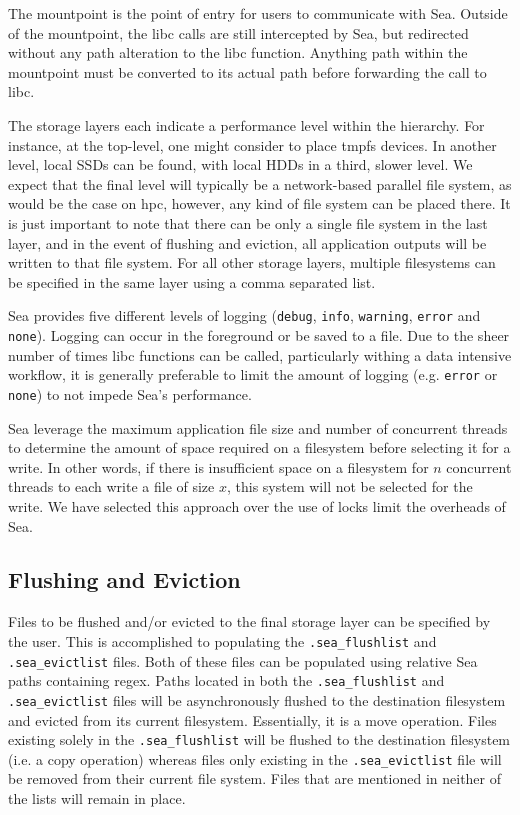 \documentclass{report}
\begin{document}
   The mountpoint is the point of entry for users to communicate with Sea. Outside of
   the mountpoint, the libc calls are still intercepted by Sea, but redirected without
   any path alteration to the libc function. Anything path within the mountpoint 
   must be converted to its actual path before forwarding the call to libc.


   The storage layers each indicate a performance level within the hierarchy. For
   instance, at the top-level, one might consider to place tmpfs devices. In another level,
   local SSDs can be found, with local HDDs in a third, slower level. We expect that the
   final level will typically be a network-based parallel file system, as would be the case
   on \gls{hpc}, however, any kind of file system can be placed there. It is just important
   to note that there can be only a single file system in the last layer, and in the event
   of flushing and eviction, all application outputs will be written to that file system.
   For all other storage layers, multiple filesystems can be specified in the same
   layer using a comma separated list.

   Sea provides five different levels of logging (\texttt{debug}, \texttt{info},
   \texttt{warning}, \texttt{error} and \texttt{none}).
   Logging can occur in the foreground or be saved to a file. Due to the sheer number
   of times libc functions can be called, particularly withing a data intensive workflow,
   it is generally preferable to limit the amount of logging (e.g. \texttt{error} or
   \texttt{none}) to not impede Sea's performance.


   Sea leverage the maximum application file size and number of concurrent threads
   to determine the amount of space required on a filesystem before selecting it for
   a write. In other words, if there is insufficient space on a filesystem for
   $n$ concurrent threads to each write a file of size $x$, this system will not be
   selected for the write. We have selected this approach over the use of locks 
   limit the overheads of Sea.
   \subsection{Flushing and Eviction}\label{subs:flushandevict}

   Files to be flushed and/or evicted to the final storage layer can be specified
   by the user. This is accomplished to populating the \texttt{.sea\_flushlist} and
   \texttt{.sea\_evictlist} files. Both of these files can be populated using relative
   Sea paths containing regex. Paths located in both the \texttt{.sea\_flushlist}
   and \texttt{.sea\_evictlist} files will be asynchronously flushed to the destination
   filesystem and evicted from its current filesystem. Essentially, it is a move operation.
   Files existing solely in the \texttt{.sea\_flushlist} will be flushed to the destination
   filesystem (i.e. a copy operation) whereas files only existing in the \texttt{.sea\_evictlist}
   file will be removed from their current file system. Files that are mentioned in neither
   of the lists will remain in place.
\end{document}
